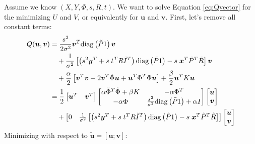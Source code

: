 \documentclass[10pt]{article}
\newcommand{\trans}[1]{#1^{T}}
\newcommand{\diag}{\mathrm{diag}}
\newcommand{\uvec}{\bm{u}}
\newcommand{\xvec}{\bm{x}}
\newcommand{\yvec}{\bm{y}}
\newcommand{\vvec}{\bm{v}}
\begin{document}
Assume we know $(X, Y, \Phi, s, R, t)$.  We want to solve Equation \eqref{eq:Qvector} for the minimizing $U$ and $V$, 
or equivalently for $\uvec$ and $\vvec$.  First, let's remove all constant terms:
\begin{align}
    Q(\uvec,\vvec) & = \dfrac{s^2}{2\sigma^2}\trans{\vvec}\diag\left(\tilde{P}1\right)\vvec\notag\\
    & \quad + \dfrac{1}{\sigma^2}\left[\left(s^2\trans{\yvec}+s\;\trans{t}R\trans{\tilde{I}}\right)
        \diag\left(\tilde{P}1\right)-s\;\trans{\xvec}\trans{\tilde{P}}\tilde{R}\right]\vvec\notag\\
    & \quad + \dfrac{\alpha}{2}\left[\trans{\vvec}\vvec -2\trans{\vvec}\tilde{\Phi}\uvec + 
       \trans{\uvec}\trans{\Phi}\Phi \uvec\right] + \dfrac{\beta}{2}\trans{\uvec}K\uvec \label{eq:Quv}\\
       & = \dfrac{1}{2}
           \begin{bmatrix}
               \trans{\uvec} & \trans{\vvec}
           \end{bmatrix} 
           \begin{bmatrix}
               \alpha\trans{\tilde{\Phi}}\tilde{\Phi}+\beta K & -\alpha\trans{\Phi}\\
               -\alpha\Phi & \frac{s^2}{\sigma^2}\diag\left(\tilde{P}1\right)+\alpha I
           \end{bmatrix}
           \begin{bmatrix}
               \uvec\\
               \vvec
           \end{bmatrix} \notag\\
         & \quad + 
            \begin{bmatrix}
                       0 & 
                       \frac{1}{\sigma^2}\left[\left(s^2\trans{\yvec}+s\;\trans{t}R\trans{\tilde{I}}\right)
                        \diag\left(\tilde{P}1\right)-s\;\trans{\xvec}\trans{\tilde{P}}\tilde{R}\right]
            \end{bmatrix}
            \begin{bmatrix}
               \uvec\\
               \vvec
           \end{bmatrix} \notag\\           
\end{align}
Minimizing with respect to $\tilde{\uvec} = [\uvec;\vvec]$:
\end{document}
